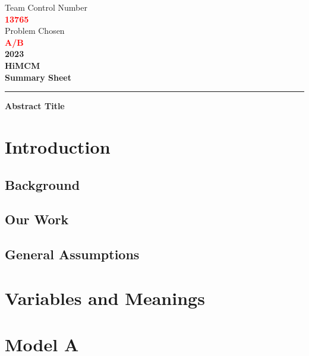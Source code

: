 \documentclass[12pt]{article}
\begin{document}
\thispagestyle{empty}
\begin{center}
    \large{Team Control Number}\\
    \Huge{\textcolor{red}{\textbf{13765}}} \\
    \large{Problem Chosen}\\
    \Huge{\textcolor{Red}{\textbf{A/B}}}\\
    \Large{\textbf{2023}}\\
    \large{\textbf{HiMCM}}\\
    \large{\textbf{Summary Sheet}}\\
\end{center}
\hrule

\begin{center}
    \large{\textbf{Abstract Title}}
\end{center}

\newpage 
\tableofcontents\thispagestyle{empty}

\newpage

\pagestyle{fancy}
\fancyfoot{}

\section{Introduction}
\subsection{Background}
\subsection{Our Work}
\subsection{General Assumptions}

\section{Variables and Meanings}

\section{Model A}



\newpage
\pagestyle{empty}
\begin{thebibliography}{99}
\end{thebibliography}
\end{document}
